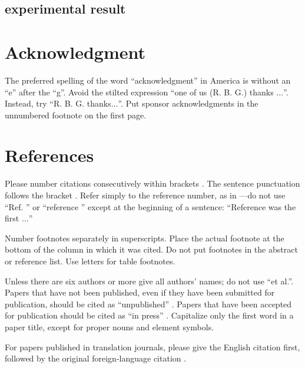 \documentclass[conference]{IEEEtran}
\begin{document}
\subsection{experimental result}

\section*{Acknowledgment}

The preferred spelling of the word ``acknowledgment'' in America is without 
an ``e'' after the ``g''. Avoid the stilted expression ``one of us (R. B. 
G.) thanks $\ldots$''. Instead, try ``R. B. G. thanks$\ldots$''. Put sponsor 
acknowledgments in the unnumbered footnote on the first page.

\section*{References}

Please number citations consecutively within brackets \cite{b1}. The 
sentence punctuation follows the bracket \cite{b2}. Refer simply to the reference 
number, as in \cite{b3}---do not use ``Ref. \cite{b3}'' or ``reference \cite{b3}'' except at 
the beginning of a sentence: ``Reference \cite{b3} was the first $\ldots$''

Number footnotes separately in superscripts. Place the actual footnote at 
the bottom of the column in which it was cited. Do not put footnotes in the 
abstract or reference list. Use letters for table footnotes.

Unless there are six authors or more give all authors' names; do not use 
``et al.''. Papers that have not been published, even if they have been 
submitted for publication, should be cited as ``unpublished'' \cite{b4}. Papers 
that have been accepted for publication should be cited as ``in press'' \cite{b5}. 
Capitalize only the first word in a paper title, except for proper nouns and 
element symbols.

For papers published in translation journals, please give the English 
citation first, followed by the original foreign-language citation \cite{b6}.
\end{document}
